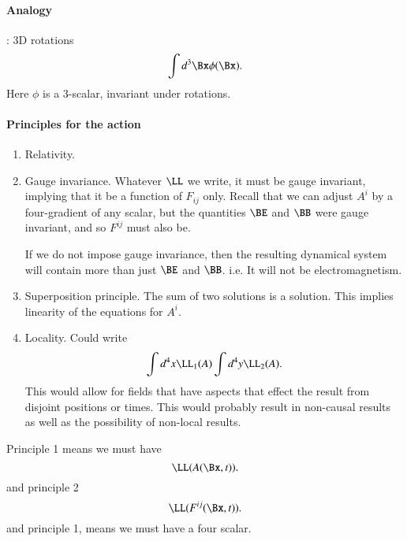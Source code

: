 \paragraph{Analogy}: 3D rotations
%
\begin{equation}\label{eqn:relativisticElectrodynamicsL12b:190}
\int d^3 \Bx \phi(\Bx).
\end{equation}
%
Here \(\phi\) is a 3-scalar, invariant under rotations.
%
\paragraph{Principles for the action}

\begin{enumerate}
\item Relativity.
\item Gauge invariance.  Whatever \(\LL\) we write, it must be gauge invariant, implying that it be a function of \(F_{ij}\) only.  Recall that we can adjust \(A^i\) by a four-gradient of any scalar, but the quantities \(\BE\) and \(\BB\) were gauge invariant, and so \(F^{ij}\) must also be.

If we do not impose gauge invariance, then the resulting dynamical system will contain more than just \(\BE\) and \(\BB\).  i.e. It will not be electromagnetism.

\item Superposition principle.  The sum of two solutions is a solution.  This implies linearity of the equations for \(A^i\).

\item Locality.  Could write
%
\begin{equation}\label{eqn:relativisticElectrodynamicsL12b:210}
\int d^4 x \LL_1(A) \int d^4 y \LL_2(A).
\end{equation}
%
This would allow for fields that have aspects that effect the result from disjoint positions or times.  This would probably result in non-causal results as well as the possibility of non-local results.
\end{enumerate}

Principle 1 means we must have
%
\begin{equation}\label{eqn:relativisticElectrodynamicsL12b:230}
\LL(A(\Bx, t)).
\end{equation}
%
and principle 2
%
\begin{equation}\label{eqn:relativisticElectrodynamicsL12b:250}
\LL(F^{ij}(\Bx, t)).
\end{equation}
%
and principle 1, means we must have a four scalar.

